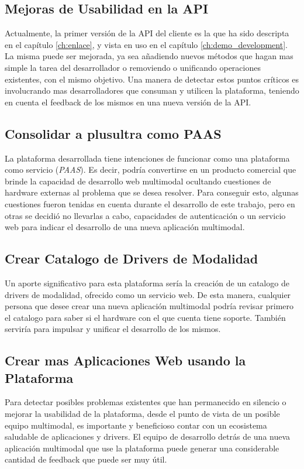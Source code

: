 \subsection{Mejoras de Usabilidad en la API}
Actualmente, la primer versión de la API del cliente es la que ha sido descripta en el capítulo \ref{ch:enlace}, y vista en uso en el capítulo \ref{ch:demo_development}. La misma puede ser mejorada, ya sea añadiendo nuevos métodos que hagan mas simple la tarea del desarrollador o removiendo o unificando operaciones existentes, con el mismo objetivo. Una manera de detectar estos puntos críticos es involucrando mas desarrolladores que consuman y utilicen la plataforma, teniendo en cuenta el feedback de los mismos en una nueva versión de la API.

\subsection{Consolidar a plusultra como PAAS}
La plataforma desarrollada tiene intenciones de funcionar como una plataforma como servicio (\emph{PAAS}). Es decir, podría convertirse en un producto comercial que brinde la capacidad de desarrollo web multimodal ocultando cuestiones de hardware externas al problema que se desea resolver. Para conseguir esto, algunas cuestiones fueron tenidas en cuenta durante el desarrollo de este trabajo, pero en otras se decidió no llevarlas a cabo, \eg capacidades de autenticación o un servicio web para indicar el desarrollo de una nueva aplicación multimodal.

\subsection{Crear Catalogo de Drivers de Modalidad}
Un aporte significativo para esta plataforma sería la creación de un catalogo de drivers de modalidad, ofrecido como un servicio web. De esta manera, cualquier persona que desee crear una nueva aplicación multimodal podría revisar primero el catalogo para saber si el hardware con el que cuenta tiene soporte. También serviría para impulsar y unificar el desarrollo de los mismos.

\subsection{Crear mas Aplicaciones Web usando la Plataforma}
Para detectar posibles problemas existentes que han permanecido en silencio o mejorar la usabilidad de la plataforma, desde el punto de vista de un posible equipo multimodal, es importante y beneficioso contar con un ecosistema saludable de aplicaciones y drivers. El equipo de desarrollo detrás de una nueva aplicación multimodal que use la plataforma puede generar una considerable cantidad de feedback que puede ser muy útil.

